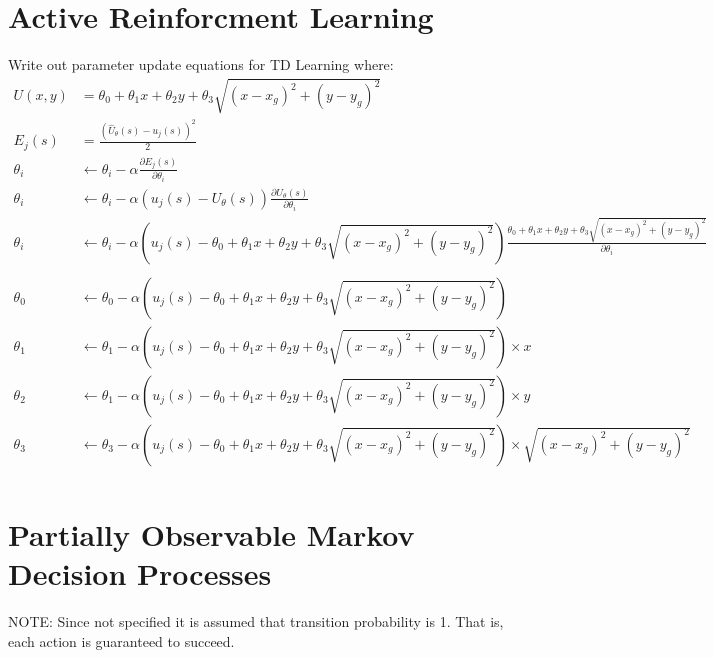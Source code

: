 \documentclass[a4paper]{article}
\begin{document}
\section{Active Reinforcment Learning}
\label{sec-3}
Write out parameter update equations for TD Learning where:\\
\begin{align*}
   U (x,y) &= \theta_0 + \theta_1 x + \theta_2 y + \theta_3 \sqrt{(x-x_g)^2 + (y-y_g)^2} \\
   E_j (s) &= \frac{\left( \hat{U}_{\theta} (s) - u_j(s) \right)^2 }{2} \\
   \theta_i &\leftarrow \theta_i - \alpha \frac{\partial E_j(s)}{\partial \theta_i} \\
   \theta_i &\leftarrow \theta_i - \alpha \left( u_j(s) - U_{\theta} (s) \right) \frac{ \partial U_{\theta} (s) }{\partial \theta_i} \\
   \theta_i &\leftarrow \theta_i - \alpha \left( u_j(s) -  \theta_0 + \theta_1 x + \theta_2 y + \theta_3 \sqrt{(x-x_g)^2 + (y-y_g)^2} \right) \frac{\theta_0 + \theta_1 x + \theta_2 y + \theta_3 \sqrt{(x-x_g)^2 + (y-y_g)^2}}{\partial \theta_i } \\
   \\
   \theta_0 &\leftarrow \theta_0 - \alpha \left( u_j(s) -  \theta_0 + \theta_1 x + \theta_2 y + \theta_3 \sqrt{(x-x_g)^2 + (y-y_g)^2} \right) \\
   \theta_1 &\leftarrow \theta_1 - \alpha \left( u_j(s) -  \theta_0 + \theta_1 x + \theta_2 y + \theta_3 \sqrt{(x-x_g)^2 + (y-y_g)^2} \right) \times x\\
   \theta_2 &\leftarrow \theta_1 - \alpha \left( u_j(s) -  \theta_0 + \theta_1 x + \theta_2 y + \theta_3 \sqrt{(x-x_g)^2 + (y-y_g)^2} \right) \times y\\
   \theta_3 &\leftarrow \theta_3 - \alpha \left( u_j(s) -  \theta_0 + \theta_1 x + \theta_2 y + \theta_3 \sqrt{(x-x_g)^2 + (y-y_g)^2} \right) \times \sqrt{(x-x_g)^2 + (y-y_g)^2} \\
\end{align*}
\section{Partially Observable Markov Decision Processes}
\label{sec-4}
NOTE: Since not specified it is assumed that transition probability is 1. That is, each action is guaranteed to succeed. \\
\end{document}
